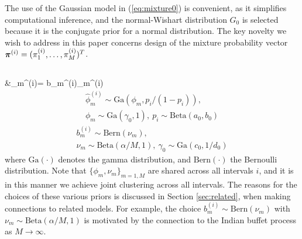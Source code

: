 \documentclass[journal]{IEEEtran}
\begin{document}
The use of the Gaussian model in (\ref{eq:mixture0}) is convenient, as it simplifies computational inference, and the normal-Wishart distribution $G_0$ is selected because it is the conjugate prior for a normal distribution. The key novelty we wish to address in this paper concerns design of the mixture probability vector $\boldsymbol{\pi}^{(i)}=(\pi_1^{(i)},\dots,\pi_{M}^{(i)})^T$.


\subsection{\label{sec:focused}}

\beqs %
&\pi_m^{(i)}=  b_m^{(i)}\hat{\phi}_m^{(i)} 
\label{eq:mixt}\eeqs 
{}
\begin{multline} \label{eq:gen1}
\hat{\phi}_m^{(i)}\sim \mbox{Ga}(\phi_m,p_i/(1-p_i)), \\
\phi_m\sim\mbox{Ga}(\gamma_0,1) ,~p_i\sim\mbox{Beta}(a_0,b_0)
\end{multline}
\begin{multline} \label{eq:gen2}
b_m^{(i)}\sim\mbox{Bern}(\nu_m), \\
\nu_m\sim\mbox{Beta}(\alpha/M,1),~\gamma_0\sim\mbox{Ga}(c_0,1/d_0)
\end{multline}
where $\mbox{Ga}(\cdot)$ denotes the gamma distribution, and $\mbox{Bern}(\cdot)$ the Bernoulli distribution. Note that $\{\phi_m,\nu_m\}_{m=1,M}$ are shared across all intervals $i$, and it is in this manner we achieve joint clustering across all  intervals. 
The reasons for the choices of these various priors is discussed in Section \ref{sec:related}, when making connections to related models. For example, the choice $b_m^{(i)}\sim\mbox{Bern}(\nu_m)$ with $\nu_m\sim\mbox{Beta}(\alpha/M,1)$ is motivated by the connection to the Indian buffet process \cite{IBP} as $M\rightarrow\infty$.
\end{document}

